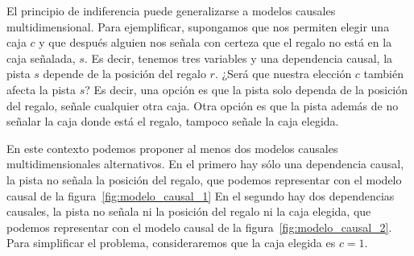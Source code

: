 \documentclass[a4paper,10pt]{book}
\theoremstyle{definition}
\begin{document}

El principio de indiferencia puede generalizarse a modelos causales multidimensional.
%
Para ejemplificar, supongamos que nos permiten elegir una caja $c$ y que despu\'es alguien nos se\~nala con certeza que el regalo no est\'a en la caja se\~nalada, $s$.
%
Es decir, tenemos tres variables y una dependencia causal, la pista $s$ depende de la posici\'on del regalo $r$.
%
¿Ser\'a que nuestra elecci\'on $c$ tambi\'en afecta la pista $s$?
%
Es decir, una opción es que la pista solo dependa de la posición del regalo, señale cualquier otra caja.
%
Otra opción es que la pista adem\'as de no se\~nalar la caja donde est\'a el regalo, tampoco se\~nale la caja elegida.


En este contexto podemos proponer al menos dos modelos causales multidimensionales alternativos.
%
En el primero hay s\'olo una dependencia causal, la pista no se\~nala la posici\'on del regalo, que podemos representar con el modelo causal de la figura~\ref{fig:modelo_causal_1}
%
En el segundo hay dos dependencias causales, la pista no se\~nala ni la posici\'on del regalo ni la caja elegida, que podemos representar con el modelo causal de la figura~\ref{fig:modelo_causal_2}.
%
Para simplificar el problema, consideraremos que la caja elegida es $c=1$.

\end{document}
